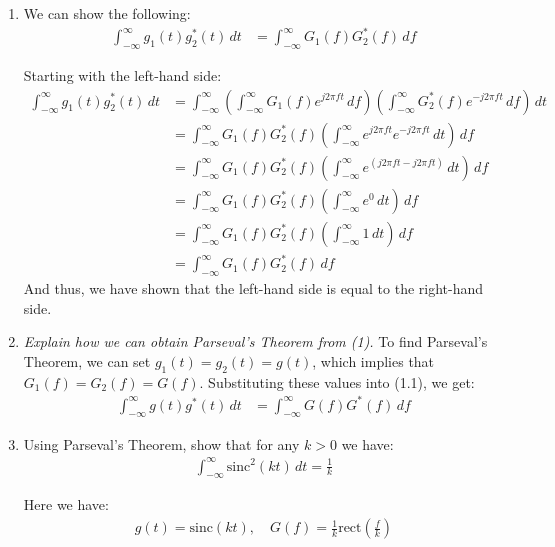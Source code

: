 \documentclass{article}
\begin{document}
\begin{enumerate}[label=1.\arabic*]
    \item We can show the following:
    \begin{align*}
        \int_{-\infty}^{\infty} g_1(t)g_2^*(t) \, dt &= \int_{-\infty}^{\infty} G_1(f)G_2^*(f) \, df
    \end{align*}

    Starting with the left-hand side:
    \begin{align*}
        \int_{-\infty}^{\infty} g_1(t)g_2^*(t) \, dt &= \int_{-\infty}^{\infty} \left( \int_{-\infty}^{\infty} G_1(f)e^{j2\pi ft} \, df \right) \left( \int_{-\infty}^{\infty} G_2^*(f)e^{-j2\pi ft} \, df \right) \, dt \\
        &= \int_{-\infty}^{\infty} G_1(f)G_2^*(f) \left( \int_{-\infty}^{\infty} e^{j2\pi ft}e^{-j2\pi ft} \, dt \right) \, df \\
        &= \int_{-\infty}^{\infty} G_1(f)G_2^*(f) \left( \int_{-\infty}^{\infty} e^{(j2\pi ft - j2\pi ft)} \, dt \right) \, df \\
        &= \int_{-\infty}^{\infty} G_1(f)G_2^*(f) \left( \int_{-\infty}^{\infty} e^{0} \, dt \right) \, df \\
        &= \int_{-\infty}^{\infty} G_1(f)G_2^*(f) \left( \int_{-\infty}^{\infty} 1 \, dt \right) \, df \\
        &= \int_{-\infty}^{\infty} G_1(f)G_2^*(f) \, df
    \end{align*}
    And thus, we have shown that the left-hand side is equal to the right-hand side.

    \item \textit{Explain how we can obtain Parseval's Theorem from (1).}
    To find Parseval's Theorem, we can set $g_1(t) = g_2(t) = g(t)$, which implies that $G_1(f) = G_2(f) = G(f)$. Substituting these values into (1.1), we get:
    \begin{align*}
        \int_{-\infty}^{\infty} g(t)g^*(t) \, dt &= \int_{-\infty}^{\infty} G(f)G^*(f) \, df
    \end{align*}
    \item Using Parseval's Theorem, show that for any $k>0$ we have:
    \begin{align*}
        \int_{-\infty}^{\infty} \text{sinc}^2(kt) \, dt = \frac{1}{k}
    \end{align*}

    Here we have:
    \begin{align*}
        g(t) = \text{sinc}(kt), \quad G(f) = \frac{1}{k}\text{rect}\left(\frac{f}{k}\right)
    \end{align*}


\end{enumerate}
\end{document}
